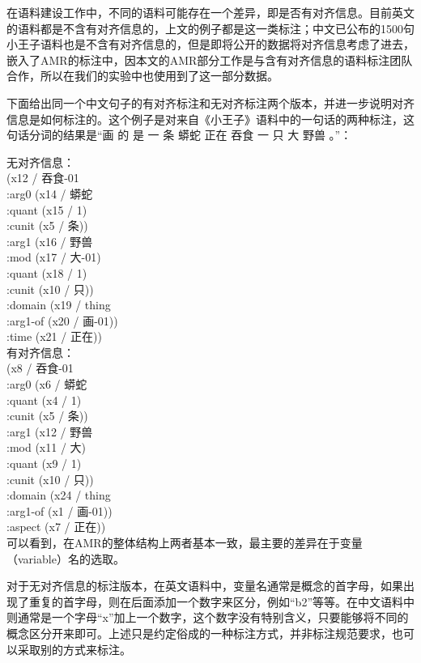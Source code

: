 \documentclass[master, winfont]{njuthesis}
\begin{document}
在语料建设工作中，不同的语料可能存在一个差异，即是否有对齐信息。目前英文的语料都是不含有对齐信息的，上文的例子都是这一类标注；中文已公布的1500句小王子语料也是不含有对齐信息的，但是即将公开的数据将对齐信息考虑了进去，嵌入了AMR的标注中，因本文的AMR部分工作是与含有对齐信息的语料标注团队合作，所以在我们的实验中也使用到了这一部分数据。

下面给出同一个中文句子的有对齐标注和无对齐标注两个版本，并进一步说明对齐信息是如何标注的。这个例子是对来自《小王子》语料中的一句话的两种标注，这句话分词的结果是“画 的 是 一 条 蟒蛇 正在 吞食 一 只 大 野兽 。”：

无对齐信息：\\
(x12 / 吞食-01 \\
      :arg0  (x14 / 蟒蛇\\
            :quant  (x15 / 1)\\
            :cunit  (x5 / 条))\\
      :arg1  (x16 / 野兽\\
            :mod  (x17 / 大-01)\\
            :quant  (x18 / 1)\\
            :cunit  (x10 / 只))\\
      :domain  (x19 / thing\\
            :arg1-of  (x20 / 画-01))\\
      :time  (x21 / 正在))\\

有对齐信息：\\
(x8 / 吞食-01\\
      :arg0  (x6 / 蟒蛇\\
            :quant  (x4 / 1)\\
            :cunit  (x5 / 条))\\
      :arg1  (x12 / 野兽\\
            :mod  (x11 / 大)\\
            :quant  (x9 / 1)\\
            :cunit  (x10 / 只))\\
      :domain  (x24 / thing\\
            :arg1-of  (x1 / 画-01))\\
      :aspect  (x7 / 正在))\\

可以看到，在AMR的整体结构上两者基本一致，最主要的差异在于变量（variable）名的选取。

对于无对齐信息的标注版本，在英文语料中，变量名通常是概念的首字母，如果出现了重复的首字母，则在后面添加一个数字来区分，例如“b2”等等。在中文语料中则通常是一个字母“x”加上一个数字，这个数字没有特别含义，只要能够将不同的概念区分开来即可。上述只是约定俗成的一种标注方式，并非标注规范要求，也可以采取别的方式来标注。
\end{document}
